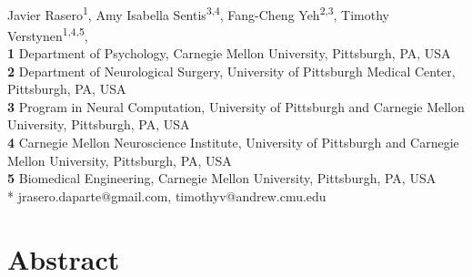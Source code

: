 \documentclass[10pt,letterpaper]{article}
\begin{document}
\vspace*{0.2in}

\begin{flushleft}
{\Large
\textbf{} %
}
\newline
\\
Javier Rasero\textsuperscript{1},
Amy Isabella Sentis\textsuperscript{3,4},
Fang-Cheng Yeh\textsuperscript{2,3},
Timothy Verstynen\textsuperscript{1,4,5},
\\
\bigskip
\textbf{1}  Department of Psychology, Carnegie Mellon University, Pittsburgh, PA, USA
\\
\textbf{2} Department of Neurological Surgery, University of Pittsburgh Medical Center, Pittsburgh, PA, USA
\\
\textbf{3} Program in Neural Computation, University of Pittsburgh and Carnegie Mellon
University, Pittsburgh, PA, USA
\\
\textbf{4} Carnegie Mellon Neuroscience Institute, University of Pittsburgh and Carnegie Mellon
University, Pittsburgh, PA, USA
\\
\textbf{5}  Biomedical Engineering, Carnegie Mellon University, Pittsburgh, PA, USA
\\
\bigskip
* jrasero.daparte@gmail.com, timothyv@andrew.cmu.edu

\end{flushleft}

\section*{Abstract}
\end{document}
